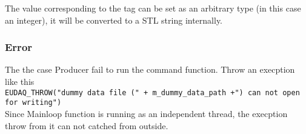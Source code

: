 The value corresponding to the tag can be set as an arbitrary type (in this case an integer),
it will be converted to a STL string internally.

\subsubsection{Error}\label{sec:Tags}
The the case Producer fail to run the command function. Throw an execption like this\\
\lstinline[style=cpp]{EUDAQ_THROW("dummy data file (" + m_dummy_data_path +") can not open for writing")}\\
Since Mainloop function is running as an independent thread, the execption throw from it can not catched from outside.


